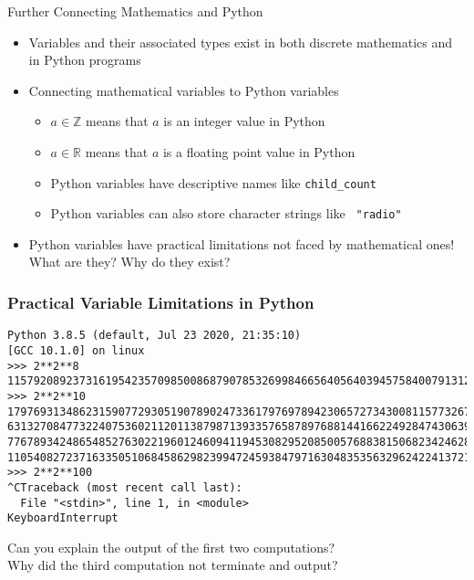 \documentclass[14pt,aspectratio=169]{beamer}
\begin{document}
%
\begin{frame}{Further Connecting Mathematics and Python}
  \begin{itemize}
    \item Variables and their associated types exist in both discrete
      mathematics and in Python programs
      \vspace*{-.15in}
    \item Connecting mathematical variables to Python variables
      \begin{itemize}
        \item $a \in \mathbb{Z}$ means that $a$ is an integer value in Python
        \item $a \in \mathbb{R}$ means that $a$ is a floating point value in
          Python
        \item Python variables have descriptive names like {\tt child\_count}
        \item Python variables can also store character strings like {\tt
          "radio"}
      \end{itemize}
      \vspace*{-.2in}
    \item Python variables have practical limitations not faced by
      mathematical ones! What are they? Why do they exist?
  \end{itemize}
\end{frame}

%
\begin{frame}[fragile]
  \frametitle{Practical Variable Limitations in Python}
  \normalsize
  \hspace*{.05in}
  \begin{minipage}{6in}
    \begin{verbatim}
Python 3.8.5 (default, Jul 23 2020, 21:35:10)
[GCC 10.1.0] on linux
>>> 2**2**8
115792089237316195423570985008687907853269984665640564039457584007913129639936
>>> 2**2**10
1797693134862315907729305190789024733617976978942306572734300811577326758055009
6313270847732240753602112011387987139335765878976881441662249284743063947412437
7767893424865485276302219601246094119453082952085005768838150682342462881473913
110540827237163350510684586298239947245938479716304835356329624224137216
>>> 2**2**100
^CTraceback (most recent call last):
  File "<stdin>", line 1, in <module>
KeyboardInterrupt
    \end{verbatim}
  \end{minipage}
  \begin{center}
    \normalsize \noindent Can you explain the output of the first two computations? \\
    Why did the third computation not terminate and output?
  \end{center}
\end{frame}
\end{document}
